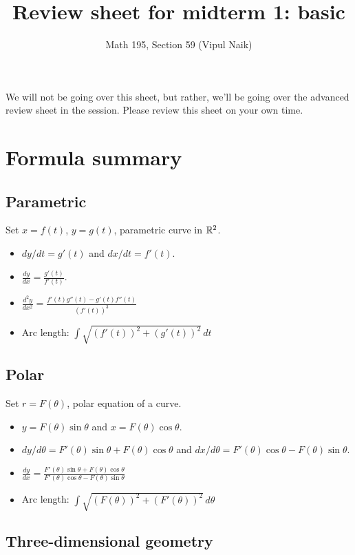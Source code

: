 \documentclass[10pt]{amsart}
\title{Review sheet for midterm 1: basic}
\author{Math 195, Section 59 (Vipul Naik)}
\begin{document}
\maketitle

We will not be going over this sheet, but rather, we'll be going over
the advanced review sheet in the session. Please review this sheet on your own time.

\section{Formula summary}

\subsection{Parametric}

Set $x = f(t)$, $y = g(t)$, parametric curve in $\mathbb{R}^2$.
\begin{itemize}
\item $dy/dt = g'(t)$ and $dx/dt = f'(t)$.
\item $\frac{dy}{dx} = \frac{g'(t)}{f'(t)}$.
\item $\frac{d^2y}{dx^2} = \frac{f'(t)g''(t) - g'(t)f''(t)}{(f'(t))^3}$
\item Arc length: $\int \sqrt{(f'(t))^2 + (g'(t))^2} \, dt$
\end{itemize}

\subsection{Polar}

Set $r = F(\theta)$, polar equation of a curve.

\begin{itemize}
\item $y = F(\theta)\sin \theta$ and $x = F(\theta)\cos \theta$.
\item $dy/d\theta = F'(\theta)\sin \theta + F(\theta)\cos \theta$ and
  $dx/d\theta = F'(\theta) \cos \theta - F(\theta) \sin \theta$.
\item $\frac{dy}{dx} = \frac{F'(\theta)\sin \theta + F(\theta)\cos
  \theta}{F'(\theta)\cos \theta - F(\theta)\sin \theta}$
\item Arc length: $\int \sqrt{(F(\theta))^2 + (F'(\theta))^2} \,
  d\theta$
\end{itemize}

\subsection{Three-dimensional geometry}
\end{document}
